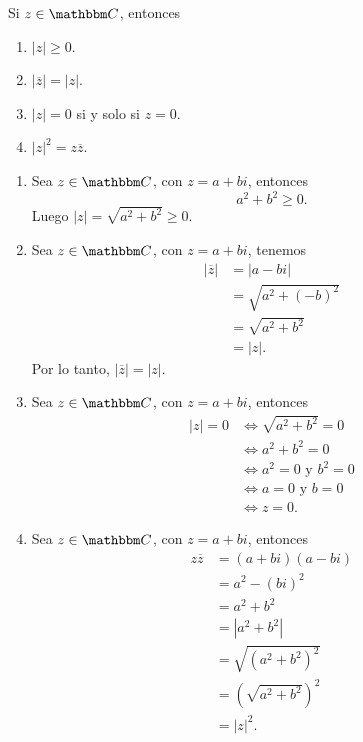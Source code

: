 \begin{proposition}
    Si $z \in \CC$, entonces
    \begin{enumerate}[label=\roman*.]
        \item $|z| \geq 0$.
        \item $|\overline{z}|=|z|$.
        \item $|z|=0$ si y solo si $z=0$.
        \item $|z|^2=z \overline{z}$.
    \end{enumerate}
    \demostracion
    \begin{enumerate}[label=\roman*.]
        \item Sea $z \in \CC$, con $z=a+bi$, entonces
        $$a^2+b^2 \geq 0.$$
        Luego $|z|=\sqrt{a^2+b^2} \geq 0$.
        \item Sea $z \in \CC$, con $z=a+bi$, tenemos
        \begin{align*}
            |\overline{z}| &=|a-bi| \\
            &=\sqrt{a^2+(-b)^2} \\
            &=\sqrt{a^2+b^2} \\
            &=|z|.
        \end{align*}
        Por lo tanto, $|\overline{z}|=|z|$.
        \item Sea $z \in \CC$, con $z=a+bi$, entonces
        \begin{align*}
            |z|=0 & \Longleftrightarrow \sqrt{a^2+b^2}=0 \\
            & \Longleftrightarrow a^2+b^2=0 \\
            & \Longleftrightarrow a^2=0 \text{ y }  b^2=0 \\
            & \Longleftrightarrow a=0 \text{ y }  b=0 \\
            & \Longleftrightarrow z=0.
        \end{align*}
        \item Sea $z \in \CC$, con $z=a+bi$, entonces
        \begin{align*}
            z \overline{z} & = (a+bi)(a-bi) \\
            & = a^2 - (bi)^2 \\
            & = a^2 + b^2 \\
            & = \left| a^2 + b^2 \right| \\
            & = \sqrt{\left(a^2+b^2\right)^2} \\
            & = \left(\sqrt{a^2+b^2}\right)^2 \\
            & = |z|^2.
        \end{align*}
    \end{enumerate}
\end{proposition}

